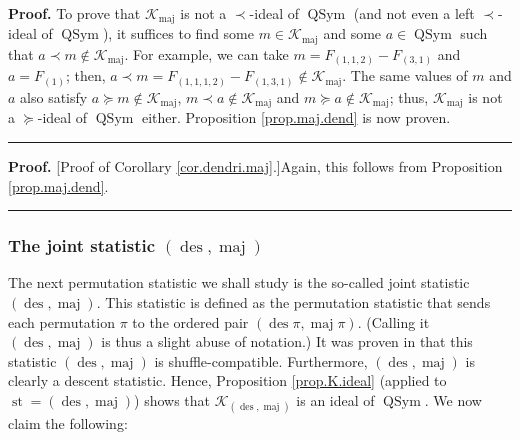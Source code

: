 \documentclass[numbers=enddot,12pt,final,onecolumn,notitlepage]{scrartcl}%
\theoremstyle{definition}
\newenvironment{proof}[1][Proof]{\noindent\textbf{#1.} }{\ \rule{0.5em}{0.5em}}
\newenvironment{verlong}{}{}
\begin{document}
\begin{verlong}
\begin{proof}
To prove that $\mathcal{K}_{\operatorname*{maj}}$ is not a $\left.
\prec\right.  $-ideal of $\operatorname*{QSym}$ (and not even a left $\left.
\prec\right.  $-ideal of $\operatorname*{QSym}$), it suffices to find some
$m\in\mathcal{K}_{\operatorname*{maj}}$ and some $a\in\operatorname*{QSym}$
such that $a\left.  \prec\right.  m\notin\mathcal{K}_{\operatorname*{maj}}$.
For example, we can take $m=F_{\left(  1,1,2\right)  }-F_{\left(  3,1\right)
}$ and $a=F_{\left(  1\right)  }$; then, $a\left.  \prec\right.  m=F_{\left(
1,1,1,2\right)  }-F_{\left(  1,3,1\right)  }\notin\mathcal{K}%
_{\operatorname*{maj}}$. The same values of $m$ and $a$ also satisfy $a\left.
\succeq\right.  m\notin\mathcal{K}_{\operatorname*{maj}}$, $m\left.
\prec\right.  a\notin\mathcal{K}_{\operatorname*{maj}}$ and $m\left.
\succeq\right.  a\notin\mathcal{K}_{\operatorname*{maj}}$; thus,
$\mathcal{K}_{\operatorname*{maj}}$ is not a $\left.  \succeq\right.  $-ideal
of $\operatorname*{QSym}$ either. Proposition \ref{prop.maj.dend} is now proven.
\end{proof}

\begin{proof}
[Proof of Corollary \ref{cor.dendri.maj}.]Again, this follows from Proposition
\ref{prop.maj.dend}.
\end{proof}

\subsubsection{The joint statistic $\left(  \operatorname{des}%
,\operatorname*{maj}\right)  $}

The next permutation statistic we shall study is the so-called joint statistic
$\left(  \operatorname{des},\operatorname*{maj}\right)  $. This statistic is
defined as the permutation statistic that sends each permutation $\pi$ to the
ordered pair $\left(  \operatorname{des}\pi,\operatorname*{maj}\pi\right)  $.
(Calling it $\left(  \operatorname{des},\operatorname*{maj}\right)  $ is thus
a slight abuse of notation.) It was proven in \cite[Theorem 4.5 \textbf{(a)}%
]{part1} that this statistic $\left(  \operatorname{des},\operatorname*{maj}%
\right)  $ is shuffle-compatible. Furthermore, $\left(  \operatorname{des}%
,\operatorname*{maj}\right)  $ is clearly a descent statistic. Hence,
Proposition \ref{prop.K.ideal} (applied to $\operatorname{st}=\left(
\operatorname{des},\operatorname*{maj}\right)  $) shows that $\mathcal{K}%
_{\left(  \operatorname{des},\operatorname*{maj}\right)  }$ is an ideal of
$\operatorname*{QSym}$. We now claim the following:


\end{verlong}
\end{document}

